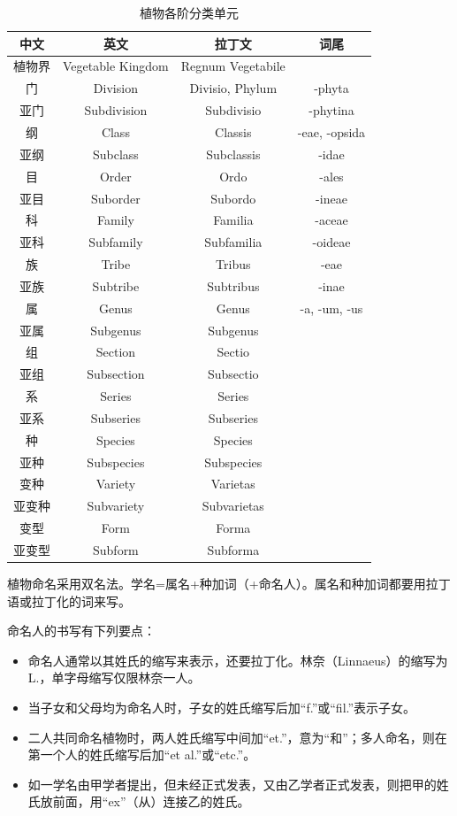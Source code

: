 \begin{table}[htbp]
	\centering
	\begin{tabularx}{\textwidth}{|C|C|C|c|}
		\hline
		中文 & 英文 & 拉丁文 & 词尾 \\ \hline
		植物界 & Vegetable Kingdom & Regnum Vegetabile &  \\ \hline
		门 & Division & Divisio, Phylum & -phyta \\ \hline
		亚门 & Subdivision & Subdivisio & -phytina \\ \hline
		纲 & Class & Classis & -eae, -opsida \\ \hline
		亚纲 & Subclass & Subclassis & -idae \\ \hline
		目 & Order & Ordo & -ales \\ \hline
		亚目 & Suborder & Subordo & -ineae \\ \hline
		科 & Family & Familia & -aceae \\ \hline
		亚科 & Subfamily & Subfamilia & -oideae \\ \hline
		族 & Tribe & Tribus & -eae \\ \hline
		亚族 & Subtribe & Subtribus & -inae \\ \hline
		属 & Genus & Genus & -a, -um, -us \\ \hline
		亚属 & Subgenus & Subgenus &  \\ \hline
		组 & Section & Sectio &  \\ \hline
		亚组 & Subsection & Subsectio &  \\ \hline
		系 & Series & Series &  \\ \hline
		亚系 & Subseries & Subseries &  \\ \hline
		种 & Species & Species &  \\ \hline
		亚种 & Subspecies & Subspecies &  \\ \hline
		变种 & Variety & Varietas &  \\ \hline
		亚变种 & Subvariety & Subvarietas &  \\ \hline
		变型 & Form & Forma &  \\ \hline
		亚变型 & Subform & Subforma &  \\ \hline
	\end{tabularx}
	\caption{植物各阶分类单元}
	\label{tab:plant_class}
\end{table}

植物命名采用双名法。学名=属名+种加词（+命名人）。属名和种加词都要用拉丁语或拉丁化的词来写。

命名人的书写有下列要点：
\begin{itemize}
	\item 命名人通常以其姓氏的缩写来表示，还要拉丁化。林奈（Linnaeus）的缩写为L.，单字母缩写仅限林奈一人。
	\item 当子女和父母均为命名人时，子女的姓氏缩写后加“f.”或“fil.”表示子女。
	\item 二人共同命名植物时，两人姓氏缩写中间加“et.”，意为“和”；多人命名，则在第一个人的姓氏缩写后加“et al.”或“etc.”。
	\item 如一学名由甲学者提出，但未经正式发表，又由乙学者正式发表，则把甲的姓氏放前面，用“ex”（从）连接乙的姓氏。
\end{itemize}

